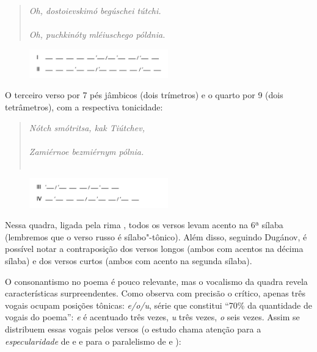 \begin{verse}
\emph{Oh, dostoievskimó begúschei tútchi.} \\
{} \\[8pt]
\emph{Oh, puchkinóty mléiuschego póldnia.} \\
{}
\end{verse}

\begin{figure}[!ht]
  \includegraphics[width=60mm]{./imgs/grafico1.jpg}
 \end{figure}


O terceiro verso por 7 pés jâmbicos (dois trímetros) e o quarto por 9
(dois tetrâmetros), com a respectiva tonicidade:

\pagebreak

\begin{verse}
\emph{Nótch smótritsa, kak Tiútchev,} \\
{} \\[8pt]
\emph{Zamiérnoe bezmiérnym pólnia.} \\
{} \\[8pt]
\end{verse}


\begin{figure}[!ht]
  \includegraphics[width=60mm]{./imgs/grafico2.jpg}
 \end{figure}

Nessa quadra, ligada pela rima , todos os versos levam acento na 6ª
sílaba (lembremos que o verso russo é sílabo"-tônico). Além disso,
seguindo Dugánov, é possível notar a contraposição dos versos longos
(ambos com acentos na décima sílaba) e dos versos curtos (ambos com
acento na segunda sílaba).

O consonantismo no poema é pouco relevante, mas o vocalismo da quadra revela características surpreendentes.
Como observa com precisão o crítico, apenas três vogais ocupam posições tônicas: \emph{e/o/u},
série que constitui ``70\% da quantidade de vogais do poema'': \emph{e} é acentuado três vezes, \emph{u}
três vezes, \emph{o} seis vezes. Assim se distribuem essas vogais pelos versos (o estudo chama atenção para a
\emph{especularidade} de  e  e para o paralelismo de  e ):


